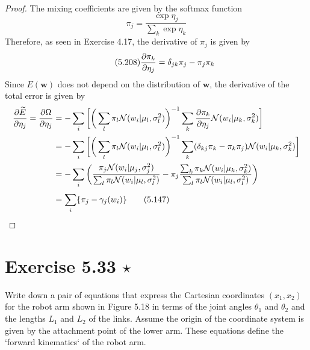 \vspace{1em}

\begin{proof}
    The mixing coefficients are given by the softmax function
    \begin{equation}\label{eq:5.146}\tag{5.146}
        \pi_j = \frac{\exp{\eta_j}}{\sum_{k}^{} \exp{\eta_k}}
    \end{equation}
    Therefore, as seen in Exercise 4.17, the derivative of $\pi_j$ is 
    given by 
    \begin{equation}\label{eq:5.208}\tag{5.208}
        \pdv{\pi_k}{\eta_j} = \delta_{jk} \pi_j - \pi_j \pi_k
    \end{equation}
    Since $E(\mathbf{w})$ does not depend on the distribution of
    $\mathbf{w}$, the derivative of the total error is given by
    \begin{align*}
        \pdv{\widetilde{E}}{\eta_j}
        = \pdv{\Omega}{\eta_j}
        &= -\sum_{i}^{} \bigg[\bigg(\sum_{l}^{} \pi_l \mathcal{N}(w_i | \mu_l, \sigma_l^2)\bigg)^{-1}
        \sum_{k}^{} \pdv{\pi_k}{\eta_j} \mathcal{N}(w_i | \mu_k, \sigma_k^2)\bigg]\\ 
        &= -\sum_{i}^{} \bigg[\bigg(\sum_{l}^{} \pi_l \mathcal{N}(w_i | \mu_l, \sigma_l^2)\bigg)^{-1}
        \sum_{k}^{} (\delta_{kj} \pi_k - \pi_k \pi_j) \mathcal{N}(w_i | \mu_k, \sigma_k^2)\bigg] \\ 
        &= -\sum_{i}^{} \bigg(\frac{\pi_j \mathcal{N}(w_i | \mu_j, \sigma_j^2)}
            {\sum_{l}^{} \pi_l \mathcal{N}(w_i | \mu_l, \sigma_l^2)}
            - \pi_j \frac{\sum_{k}^{} \pi_k \mathcal{N}(w_i | \mu_k, \sigma_k^2)}
            {\sum_{l} {\pi_l \mathcal{N}(w_i | \mu_l, \sigma_l^2)}}\bigg) \\
        &= \sum_{i}^{} \{\pi_j - \gamma_j(w_i)\} \label{eq:5.147}\tag{5.147}
    \end{align*}
\end{proof}

\section*{Exercise 5.33 $\star$}
Write down a pair of equations that express the Cartesian coordinates
$(x_1, x_2)$ for the robot arm shown in Figure 5.18 in terms of the joint
angles $\theta_1$ and $\theta_2$ and the lengths $L_1$ and $L_2$ of the links.
Assume the origin of the coordinate system is given by the attachment point of
the lower arm. These equations define the `forward kinematics` of the robot arm.

